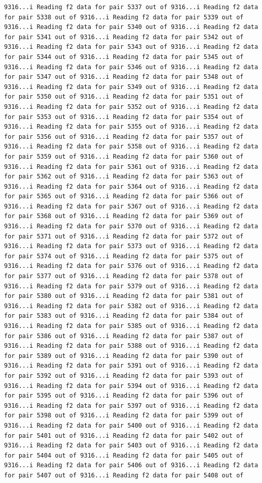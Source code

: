\documentclass[
]{article}
\begin{document}
\begin{verbatim}
9316...i Reading f2 data for pair 5337 out of 9316...i Reading f2 data for pair 5338 out of 9316...i Reading f2 data for pair 5339 out of 9316...i Reading f2 data for pair 5340 out of 9316...i Reading f2 data for pair 5341 out of 9316...i Reading f2 data for pair 5342 out of 9316...i Reading f2 data for pair 5343 out of 9316...i Reading f2 data for pair 5344 out of 9316...i Reading f2 data for pair 5345 out of 9316...i Reading f2 data for pair 5346 out of 9316...i Reading f2 data for pair 5347 out of 9316...i Reading f2 data for pair 5348 out of 9316...i Reading f2 data for pair 5349 out of 9316...i Reading f2 data for pair 5350 out of 9316...i Reading f2 data for pair 5351 out of 9316...i Reading f2 data for pair 5352 out of 9316...i Reading f2 data for pair 5353 out of 9316...i Reading f2 data for pair 5354 out of 9316...i Reading f2 data for pair 5355 out of 9316...i Reading f2 data for pair 5356 out of 9316...i Reading f2 data for pair 5357 out of 9316...i Reading f2 data for pair 5358 out of 9316...i Reading f2 data for pair 5359 out of 9316...i Reading f2 data for pair 5360 out of 9316...i Reading f2 data for pair 5361 out of 9316...i Reading f2 data for pair 5362 out of 9316...i Reading f2 data for pair 5363 out of 9316...i Reading f2 data for pair 5364 out of 9316...i Reading f2 data for pair 5365 out of 9316...i Reading f2 data for pair 5366 out of 9316...i Reading f2 data for pair 5367 out of 9316...i Reading f2 data for pair 5368 out of 9316...i Reading f2 data for pair 5369 out of 9316...i Reading f2 data for pair 5370 out of 9316...i Reading f2 data for pair 5371 out of 9316...i Reading f2 data for pair 5372 out of 9316...i Reading f2 data for pair 5373 out of 9316...i Reading f2 data for pair 5374 out of 9316...i Reading f2 data for pair 5375 out of 9316...i Reading f2 data for pair 5376 out of 9316...i Reading f2 data for pair 5377 out of 9316...i Reading f2 data for pair 5378 out of 9316...i Reading f2 data for pair 5379 out of 9316...i Reading f2 data for pair 5380 out of 9316...i Reading f2 data for pair 5381 out of 9316...i Reading f2 data for pair 5382 out of 9316...i Reading f2 data for pair 5383 out of 9316...i Reading f2 data for pair 5384 out of 9316...i Reading f2 data for pair 5385 out of 9316...i Reading f2 data for pair 5386 out of 9316...i Reading f2 data for pair 5387 out of 9316...i Reading f2 data for pair 5388 out of 9316...i Reading f2 data for pair 5389 out of 9316...i Reading f2 data for pair 5390 out of 9316...i Reading f2 data for pair 5391 out of 9316...i Reading f2 data for pair 5392 out of 9316...i Reading f2 data for pair 5393 out of 9316...i Reading f2 data for pair 5394 out of 9316...i Reading f2 data for pair 5395 out of 9316...i Reading f2 data for pair 5396 out of 9316...i Reading f2 data for pair 5397 out of 9316...i Reading f2 data for pair 5398 out of 9316...i Reading f2 data for pair 5399 out of 9316...i Reading f2 data for pair 5400 out of 9316...i Reading f2 data for pair 5401 out of 9316...i Reading f2 data for pair 5402 out of 9316...i Reading f2 data for pair 5403 out of 9316...i Reading f2 data for pair 5404 out of 9316...i Reading f2 data for pair 5405 out of 9316...i Reading f2 data for pair 5406 out of 9316...i Reading f2 data for pair 5407 out of 9316...i Reading f2 data for pair 5408 out of 
\end{verbatim}
\end{document}
